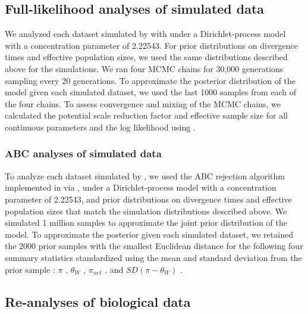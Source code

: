 \documentclass[letterpaper,12pt]{article}
\begin{document}
\subsection{Full-likelihood analyses of simulated data}

We analyzed each dataset simulated by \simcoevolity with \ecoevolity
\citep[Version 0.3.2, Commit c128046;][]{Oaks2018ecoevolity,Oaks2018paic}
under a Dirichlet-process model with a concentration parameter of 2.22543.
For prior distributions on divergence times and effective population sizes, we
used the same distributions described above for the simulations.
We ran four MCMC chains for 30,000 generations sampling every 20 generations.
To approximate the posterior distribution of the model given each simulated
dataset, we used the last 1000 samples from each of the four chains.
To assess convergence and mixing of the MCMC chains, we calculated the
potential scale reduction factor \citep[PSRF; the square root of Equation 1.1
in][]{Brooks1998} and effective sample size \citep[ESS;][]{Gong2014} for all
continuous parameters and the log likelihood using
\pycoevolity
\citep[Version 0.2.11 Commit 85ea44b;][]{Oaks2018ecoevolity,PycoevolityRepoOnline}.

\subsubsection{ABC analyses of simulated data}

To analyze each dataset simulated by \pymsbayes, we used the ABC rejection
algorithm implemented in \dppmsbayes via \pymsbayes \citep[Version 0.3.7,
Commit 54f720df;][]{Oaks2014dpp},
under a Dirichlet-process model with a concentration parameter of 2.22543, and
prior distributions on divergence times and effective population sizes that
match the simulation distributions described above.
We simulated 1 million samples to approximate the joint prior distribution of
the model.
To approximate the posterior given each simulated dataset, we retained the 2000
prior samples with the smallest Euclidean distance for the following four
summary statistics standardized using the mean and standard deviation from the
prior sample
\citep{Oaks2014dpp}:
$\pi$ \cite{Tajima1983}, $\theta_W$ \cite{Watterson1975}, $\pi_{net}$
\cite{Takahata1985}, and $SD(\pi-\theta_W)$ \cite{Tajima1989}.

\subsection{Re-analyses of biological data}
\end{document}
